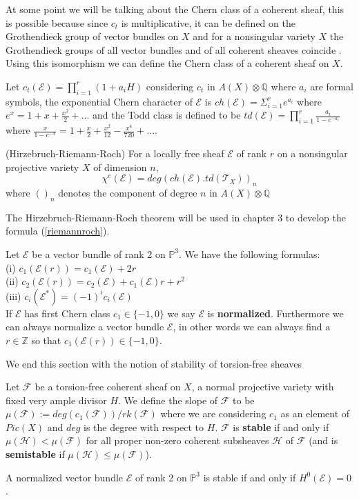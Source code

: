 \documentclass[
	oldfontcommands,
	sumario=abnt-6027-2012,
	12pt,			%
	openright,		%
	oneside,		%
	a4paper,		%
	english,		%
	brazil			%
	]{imecc-unicamp}
\begin{document}
At some point we will be talking about the Chern class of a coherent sheaf, this is possible because since $c_t$ is multiplicative, it can be defined on the Grothendieck group of vector bundles on $X$ \cite[Hartshorne, p.435]{hartshorne_2010} and for a nonsingular variety $X$ the Grothendieck groups of all vector bundles and of all coherent sheaves coincide \cite[Hartshorne, III Ex. 6.9]{hartshorne_2010}. Using this isomorphism we can define the Chern class of a coherent sheaf on $X$.

Let $c_t(\mathcal{E})=\prod_{i=1}^r (1+a_iH)$ considering $c_t$ in $A(X) \otimes \mathbb{Q}$ where $a_i$ are formal symbols, the exponential Chern character of $\mathcal{E}$ is $ch(\mathcal{E})=\Sigma_{i=1}^r e^{a_i}$ where $e^x=1+x+\frac{x^2}{2}+...$  and the Todd class is defined to be $td(\mathcal{E})=\prod_{i=1}^{r} \frac{a_i}{1-e^{-a_i}}$ where $\frac{x}{1-e^{-x}}=1+\frac{x}{2}+\frac{x^2}{12}-\frac{x^4}{720}+...$.
\begin{theorem}(Hirzebruch-Riemann-Roch)\label{hirzebruchriemannroch}
	For a locally free sheaf $\mathcal{E}$ of rank $r$ on a nonsingular projective variety $X$ of dimension $n$,
	\begin{equation}
	\chi^e(\mathcal{E})=deg(ch(\mathcal{E}).td(\mathcal{T}_X))_n
	\end{equation}
	where $()_n$ denotes the component of degree $n$ in $A(X)\otimes \mathbb{Q}$
\end{theorem}
The Hirzebruch-Riemann-Roch theorem will be used in chapter 3 to develop the formula (\ref{riemannroch}).

Let $\mathcal{E}$ be a vector bundle of rank 2 on $\mathbb{P}^3$. We have the following formulas: \\
(i) $c_1(\mathcal{E}(r))=c_1(\mathcal{E})+2r$ \\
(ii) $c_2(\mathcal{E}(r))=c_2(\mathcal{E})+c_1(\mathcal{E})r+r^2$ \\
(iii) $c_i(\mathcal{E}^*)=(-1)^i c_i(\mathcal{E})$\\
If $\mathcal{E}$ has first Chern class $c_1 \in \{-1,0\}$ we say $\mathcal{E}$ is \textbf{normalized}.
Furthermore we can always normalize a vector bundle $\mathcal{E}$, in other words we can always find a $r \in \mathbb{Z}$ so that $c_1(\mathcal{E}(r)) \in \{-1,0 \}$.

We end this section with the notion of stability of torsion-free sheaves
\begin{definition}
	Let $\mathcal{F}$ be a torsion-free coherent sheaf on $X$, a normal projective variety with fixed very ample divisor $H$. We define the slope of $\mathcal{F}$ to be $\mu({\mathcal{F}}):=deg(c_1(\mathcal{F}))/rk(\mathcal{F})$ where we are considering $c_1$ as an element of $Pic(X)$ and $deg$ is the degree with respect to $H$. $\mathcal{F}$ is \textbf{stable} if and only if $\mu({\mathcal{H}})<\mu({\mathcal{F}})$ for all proper non-zero coherent subsheaves $\mathcal{H}$ of $\mathcal{F}$ (and is \textbf{semistable} if $\mu({\mathcal{H}}) \leq \mu({\mathcal{F}})$).
\end{definition}
A normalized vector bundle $\mathcal{E}$ of rank 2 on $\mathbb{P}^3$ is stable if and only if $H^0(\mathcal{E})=0$ \cite[Okonek, Schneider \& Spindler, p. 167]{Okonek}.
\end{document}
